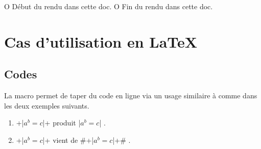 


\usepackage[lang = FR]{../main/main}
\usepackage{../macroenv/macroenv}
\usepackage{../inenglish/inenglish}
\usepackage{../showcase/showcase}
\usepackage{../rem-exa/rem-exa}


\usepackage{listing}





                       { O{ Début du rendu dans cette doc. }
                         O{ Fin du rendu dans cette doc. } }{
    \begin{colorstrip}{green!5}
        \smallskip
}{
        \smallskip
        \bdocextraruler{#2}
    \end{colorstrip}
}




\section{Cas d'utilisation en \LaTeX}

\subsection{Codes }

La macro  permet de taper du code en ligne via un usage similaire à  comme dans les deux exemples suivants.

\begin{enumerate}
    \item \docilatex+\docilatex|$a^b = c$|+ produit \docilatex|$a^b = c$| .

    \item \docilatex+\docilatex|$a^b = c$|+ vient de \docilatex#\docilatex+\docilatex|$a^b = c$|+# .
\end{enumerate}


